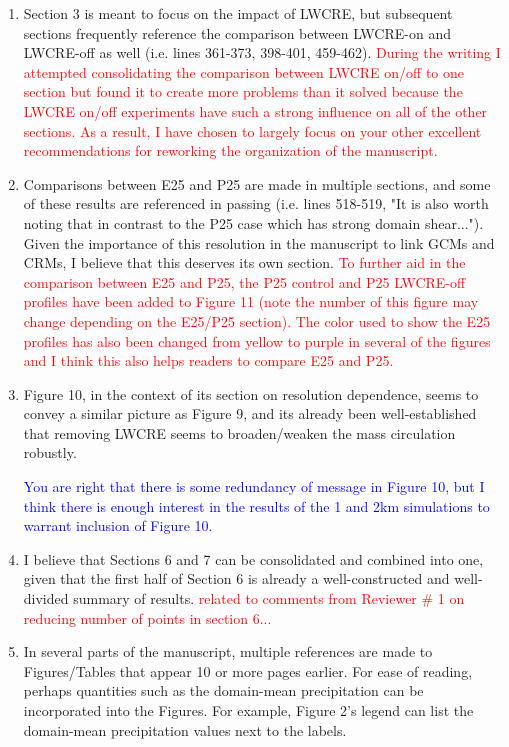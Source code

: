 \documentclass[draft]{agujournal2019}
\begin{document}
\begin{enumerate}
  \item Section 3 is meant to focus on the impact of LWCRE, but subsequent sections frequently reference the comparison between LWCRE-on and LWCRE-off as well (i.e. lines 361-373, 398-401, 459-462).
  \textcolor{red}{During the writing I attempted consolidating the comparison between LWCRE on/off to one section but found it to create more problems than it solved because the LWCRE on/off experiments have such a strong influence on all of the other sections.  As a result, I have chosen to largely focus on your other excellent recommendations for reworking the organization of the manuscript.}
  \item Comparisons between E25 and P25 are made in multiple sections, and some of these results are referenced in passing (i.e. lines 518-519, "It is also worth noting that in contrast to the P25 case which has strong domain shear..."). Given the importance of this resolution in the manuscript to link GCMs and CRMs, I believe that this deserves its own section.
  \textcolor{red}{To further aid in the comparison between E25 and P25, the P25 control and P25 LWCRE-off profiles have been added to Figure 11 (note the number of this figure may change depending on the E25/P25 section).  The color used to show the E25 profiles has also been changed from yellow to purple in several of the figures and I think this also helps readers to compare E25 and P25.}
  \item Figure 10, in the context of its section on resolution dependence, seems to convey a similar picture as Figure 9, and its already been well-established that removing LWCRE seems to broaden/weaken the mass circulation robustly.  
  
  \textcolor{blue}{You are right that there is some redundancy of message in Figure 10, but I think there is enough interest in the results of the 1 and 2km simulations to warrant inclusion of Figure 10. }
  
  \item I believe that Sections 6 and 7 can be consolidated and combined into one, given that the first half of Section 6 is already a well-constructed and well-divided summary of results.
  \textcolor{red}{related to comments from Reviewer \# 1 on reducing number of points in section 6...}
  \item In several parts of the manuscript, multiple references are made to Figures/Tables that appear 10 or more pages earlier. For ease of reading, perhaps quantities such as the domain-mean precipitation can be incorporated into the Figures. For example, Figure 2's legend can list the domain-mean precipitation values next to the labels.
\end{enumerate}
\end{document}
